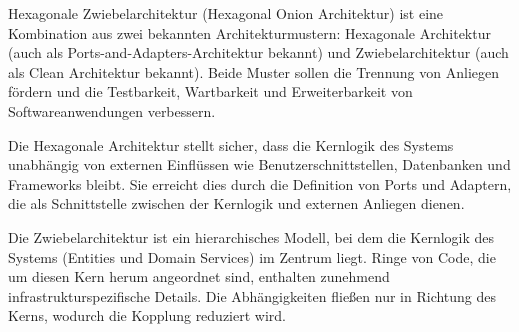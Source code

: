 \documentclass[../vs-script-first-v01.tex]{subfiles}
\begin{document}
Hexagonale Zwiebelarchitektur (Hexagonal Onion Architektur) ist eine Kombination aus zwei bekannten Architekturmustern: Hexagonale Architektur (auch als Ports-and-Adapters-Architektur bekannt) und Zwiebelarchitektur (auch als Clean Architektur bekannt). Beide Muster sollen die Trennung von Anliegen fördern und die Testbarkeit, Wartbarkeit und Erweiterbarkeit von Softwareanwendungen verbessern.

Die Hexagonale Architektur stellt sicher, dass die Kernlogik des Systems unabhängig von externen Einflüssen wie Benutzerschnittstellen, Datenbanken und Frameworks bleibt. Sie erreicht dies durch die Definition von Ports und Adaptern, die als Schnittstelle zwischen der Kernlogik und externen Anliegen dienen.

Die Zwiebelarchitektur ist ein hierarchisches Modell, bei dem die Kernlogik des Systems (Entities und Domain Services) im Zentrum liegt. Ringe von Code, die um diesen Kern herum angeordnet sind, enthalten zunehmend infrastrukturspezifische Details. Die Abhängigkeiten fließen nur in Richtung des Kerns, wodurch die Kopplung reduziert wird.
\end{document}
